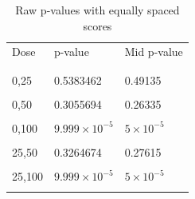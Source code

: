 \documentclass[12pt,oneside]{report}
\theoremstyle{definition}
\theoremstyle{mystyle}
\begin{document}
\begin{table}[h!]
	\begin{center}
		\begin{tabular}{ l l l }
			\toprule \toprule
			Dose& p-value  &\hspace{5mm}Mid p-value  \\
			
			& &\hspace{5mm} \\ \toprule
			&\\
			0,25& 0.5383462 &\hspace{5mm}0.49135 \\\hline
			&\\
			0,50&0.3055694 &\hspace{5mm}0.26335\\ \hline
			&\\
			0,100 & $9.999\times 10^{-5}$ &\hspace{5mm}$5 \times 10^{-5}$\\ \hline
			&\\
			25,50 & 0.3264674 &\hspace{5mm} 0.27615\\ \hline
			&\\
			25,100 & $9.999\times 10^{-5}$ &\hspace{5mm}$5 \times 10^{-5}$\\ \bottomrule
			&\\
		\end{tabular}
		\caption{Raw p-values with equally spaced scores}
		\label{tabx:r1t}
	\end{center}
\end{table}	
\end{document}
